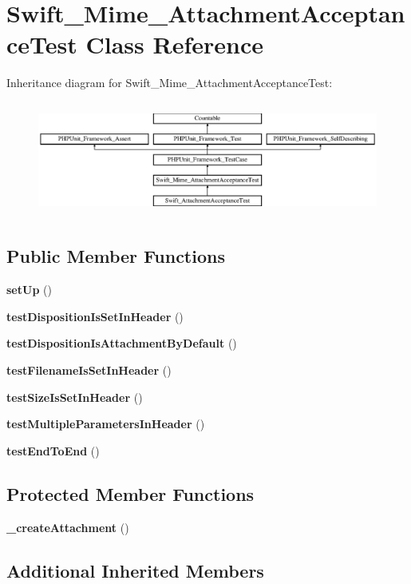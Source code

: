\section{Swift\+\_\+\+Mime\+\_\+\+Attachment\+Acceptance\+Test Class Reference}
\label{class_swift___mime___attachment_acceptance_test}
Inheritance diagram for Swift\+\_\+\+Mime\+\_\+\+Attachment\+Acceptance\+Test\+:\begin{figure}[H]
\begin{center}
\leavevmode
\includegraphics[height=3.825137cm]{class_swift___mime___attachment_acceptance_test}
\end{center}
\end{figure}
\subsection*{Public Member Functions}
\begin{DoxyCompactItemize}
\item 
{\bf set\+Up} ()
\item 
{\bf test\+Disposition\+Is\+Set\+In\+Header} ()
\item 
{\bf test\+Disposition\+Is\+Attachment\+By\+Default} ()
\item 
{\bf test\+Filename\+Is\+Set\+In\+Header} ()
\item 
{\bf test\+Size\+Is\+Set\+In\+Header} ()
\item 
{\bf test\+Multiple\+Parameters\+In\+Header} ()
\item 
{\bf test\+End\+To\+End} ()
\end{DoxyCompactItemize}
\subsection*{Protected Member Functions}
\begin{DoxyCompactItemize}
\item 
{\bf \+\_\+create\+Attachment} ()
\end{DoxyCompactItemize}
\subsection*{Additional Inherited Members}


